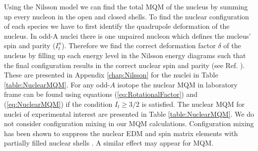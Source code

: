 \documentclass[10pt,a4paper, twoside, openright]{report}
\begin{document}
Using the Nilsson model we can find the total MQM of the nucleus by summing up every nucleon in the open and closed shells. To find the nuclear configuration of each species we have to first identify the quadrupole deformation of the nucleus. In  odd-A nuclei there is  one unpaired nucleon which defines the nucleus' spin  and parity ($I_t^{\pi}$). Therefore we find the correct deformation factor $\delta$ of the nucleus by filling up each energy level in the Nilsson energy diagrams \cite{BohrMottVol2} such that the final configuration results in the correct nuclear spin and parity (see Ref. \cite{BF2018}). These are presented in Appendix \ref{chap:Nilsson} for the nuclei in Table \ref{table:NuclearMQM}.   For any odd-$A$ isotope the nuclear MQM in laboratory frame can be found  using equations (\ref{eq:RotationalFactor})  and (\ref{eq:NuclearMQM}) if the condition $I_t \geq 3/2$ is satisfied. The nuclear MQM  for nuclei of experimental interest are presented in  Table \ref{table:NuclearMQM}. We do not consider configuration mixing in our MQM calculations. Configuration mixing has been shown to suppress the nuclear EDM and spin matrix elements with partially filled nuclear shells \cite{Yoshinaga2010, Yoshinaga2014, Yamanaka2017}. A similar effect may appear for MQM. \\
\end{document}
